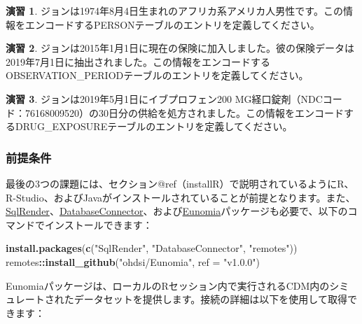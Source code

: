 \documentclass[
  11pt]{book}
\newenvironment{Shaded}{\begin{snugshade}}{\end{snugshade}}
\newcommand{\AttributeTok}[1]{\textcolor[rgb]{0.13,0.29,0.53}{#1}}
\newcommand{\FunctionTok}[1]{\textcolor[rgb]{0.13,0.29,0.53}{\textbf{#1}}}
\newcommand{\NormalTok}[1]{#1}
\newcommand{\SpecialCharTok}[1]{\textcolor[rgb]{0.81,0.36,0.00}{\textbf{#1}}}
\newcommand{\StringTok}[1]{\textcolor[rgb]{0.31,0.60,0.02}{#1}}
\theoremstyle{definition}
\theoremstyle{definition}
\theoremstyle{definition}
\newtheorem{exercise}{演習}[chapter]
\theoremstyle{definition}
\theoremstyle{remark}
\begin{document}
\begin{exercise}
\protect\hypertarget{exr:exerciseJohnPerson}{}\label{exr:exerciseJohnPerson}ジョンは1974年8月4日生まれのアフリカ系アメリカ人男性です。この情報をエンコードするPERSONテーブルのエントリを定義してください。
\end{exercise}

\begin{exercise}
\protect\hypertarget{exr:exerciseJohnOp}{}\label{exr:exerciseJohnOp}ジョンは2015年1月1日に現在の保険に加入しました。彼の保険データは2019年7月1日に抽出されました。この情報をエンコードするOBSERVATION\_PERIODテーブルのエントリを定義してください。
\end{exercise}

\begin{exercise}
\protect\hypertarget{exr:exerciseJohnDrug}{}\label{exr:exerciseJohnDrug}ジョンは2019年5月1日にイブプロフェン200 MG経口錠剤（NDCコード：76168009520）の30日分の供給を処方されました。この情報をエンコードするDRUG\_EXPOSUREテーブルのエントリを定義してください。
\end{exercise}

\subsubsection*{前提条件}\label{ux524dux63d0ux6761ux4ef6-1}

最後の3つの課題には、セクション@ref（installR）で説明されているようにR、R-Studio、およびJavaがインストールされていることが前提となります。また、\href{https://ohdsi.github.io/SqlRender/}{SqlRender}、\href{https://ohdsi.github.io/DatabaseConnector/}{DatabaseConnector}、および\href{https://ohdsi.github.io/Eunomia/}{Eunomia}パッケージも必要で、以下のコマンドでインストールできます：

\begin{Shaded}
\begin{Highlighting}[]
\FunctionTok{install.packages}\NormalTok{(}\FunctionTok{c}\NormalTok{(}\StringTok{"SqlRender"}\NormalTok{, }\StringTok{"DatabaseConnector"}\NormalTok{, }\StringTok{"remotes"}\NormalTok{))}
\NormalTok{remotes}\SpecialCharTok{::}\FunctionTok{install\_github}\NormalTok{(}\StringTok{"ohdsi/Eunomia"}\NormalTok{, }\AttributeTok{ref =} \StringTok{"v1.0.0"}\NormalTok{)}
\end{Highlighting}
\end{Shaded}

Eunomiaパッケージは、ローカルのRセッション内で実行されるCDM内のシミュレートされたデータセットを提供します。接続の詳細は以下を使用して取得できます：
\end{document}
